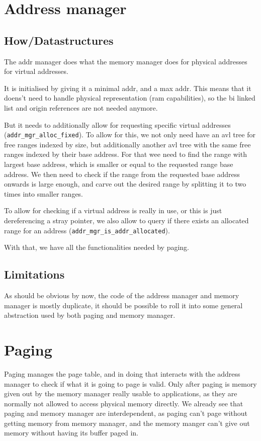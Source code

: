 \section{Address manager}

\subsection{How/Datastructures}

The addr manager does what the memory manager does for physical addresses for
virtual addresses.

It is initialised by giving it a minimal addr, and a max addr.
This means that it doens't need to handle physical representation (ram
capabilities), so the bi linked list and origin references are not needed anymore.

But it needs to additionally allow for requesting specific virtual addresses
(\verb|addr_mgr_alloc_fixed|).
To allow for this, we not only need have an avl tree for free ranges indexed by
size, but additionally another avl tree with the same free ranges indexed by
their base address.
For that wee need to find the range with largest base address, which is smaller
or equal to the requested range base address.
We then need to check if the range from the requested base address onwards is
large enough, and carve out the desired range by splitting it to two times into
smaller ranges.

To allow for checking if a virtual address is really in use, or this is just
dereferencing a stray pointer, we also allow to query if there exists an
allocated range for an address (\verb|addr_mgr_is_addr_allocated|).

With that, we have all the functionalities needed by paging.

\subsection{Limitations}

As should be obvious by now, the code of the address manager and memory manager
is mostly duplicate, it should be possible to roll it into some general
abstraction used by both paging and memory manager.

\section{Paging}

Paging manages the page table, and in doing that interacts with the address
manager to check if what it is going to page is valid.
Only after paging is memory given out by the memory manager really usable to
applications, as they are normally not allowed to access physical memory
directly.
We already see that paging and memory manager are interdependent, as
paging can't page without getting memory from memory manager, and the memory
manger can't give out memory without having its buffer paged in.

